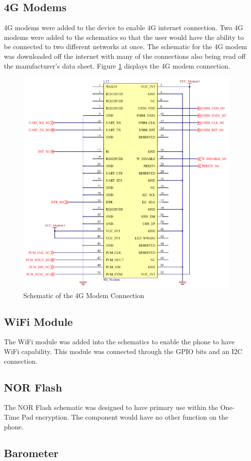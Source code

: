 \subsection{4G Modems}
\label{chap:modem}

	4G modems were added to the device to enable 4G internet connection. 
Two 4G modems were added to the schematics so that the user would have the ability to be connected to two different networks at once.
The schematic for the 4G modem was downloaded off the internet with many of the connections also being read off the manufacturer's data sheet. 
Figure \ref{fig:modem} displays the 4G modem connection. 

\begin{figure}
	\includegraphics[width=0.5\linewidth]{Figures/modem.pdf}\centering
	\caption{Schematic of the 4G Modem Connection}
	\label{fig:modem}
\end{figure}

\subsection{WiFi Module}

	The WiFi module was added into the schematics to enable the phone to have WiFi capability. This module was connected through the GPIO bits and an I2C connection.

\subsection{NOR Flash}

	The NOR Flash schematic was designed to have primary use within the One-Time Pad encryption. The component would have no other function on the phone. 

\subsection{Barometer}

